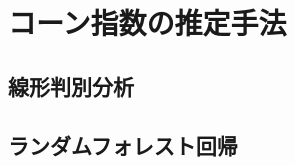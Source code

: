 \documentclass[../main]{subfiles}
\begin{document}
\graphicspath{{../figures/chap3/}}

\section{コーン指数の推定手法}
\label{sec:pmethod_estimation}

\subsection{線形判別分析}
\label{subsec:pmethod_est_lda}

\subsection{ランダムフォレスト回帰}
\label{subsec:pmethod_est_rfr}
\end{document}
